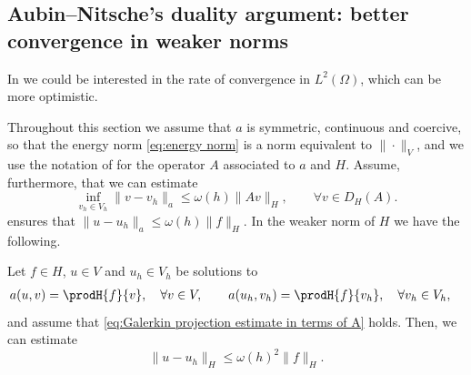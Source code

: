 \subsection{Aubin--Nitsche's duality argument: better convergence in weaker norms}

In  we could be interested in the rate of convergence in $L^2 (\Omega)$, which can be more optimistic.

Throughout this section we assume that $a$ is symmetric, continuous and coercive, so that the energy norm \eqref{eq:energy norm} is a norm equivalent to $\|\cdot\|_V$, and we use the notation of  for the operator $A$ associated to $a$ and $H$.
Assume, furthermore, that we can estimate
\begin{equation}
    \label{eq:Galerkin projection estimate in terms of A}
    \inf_{v_h \in V_h} \| v - v_h \|_a \le \omega(h) \| A v \|_{H}, \qquad \forall v \in D_H(A).
\end{equation}
 ensures that $\|u - u_h\|_a \le \omega(h) \| f \|_{H}$. In the weaker norm of $H$ we have the following.
\begin{lemma}
    \label{lem:Aubin-Nietsche}
    Let $f \in H$, $u \in V$ and $u_h \in V_h$ be solutions to
    \begin{align}
        a(u,v)
         & = \prodH{f}{v} , \quad \forall v \in V,
        \qquad
        a(u_h,v_h)
        = \prodH{f}{v_h} , \quad \forall v_h \in V_h,
    \end{align}
    and assume that \eqref{eq:Galerkin projection estimate in terms of A} holds.
    Then, we can estimate
    \begin{equation*}
        \| u - u_h \|_H \le \omega(h)^2 \| f \|_{H}.
    \end{equation*}
\end{lemma}


